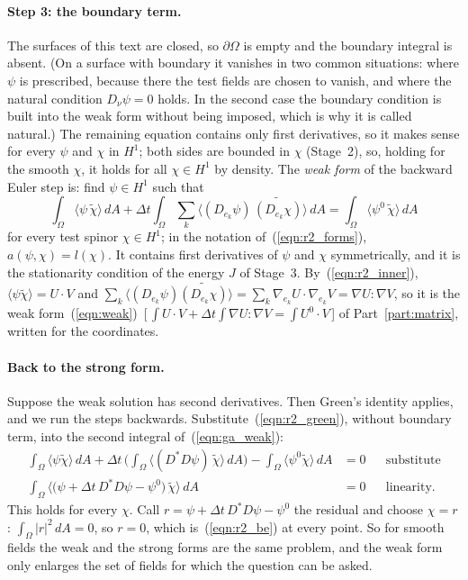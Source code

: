 \paragraph{Step 3: the boundary term.} The surfaces of this text are closed, so $\partial\Omega$ is empty and the boundary integral is absent. (On a surface with boundary it vanishes in two common situations: where $\psi$ is prescribed, because there the test fields are chosen to vanish, and where the natural condition $D_\nu\psi = 0$ holds. In the second case the boundary condition is built into the weak form without being imposed, which is why it is called natural.) The remaining equation contains only first derivatives, so it makes sense for every $\psi$ and $\chi$ in $H^1$; both sides are bounded in $\chi$ (Stage~2), so, holding for the smooth $\chi$, it holds for all $\chi\in H^1$ by density. The \emph{weak form} of the backward Euler step is: find $\psi \in H^1$ such that
\begin{equation}
\label{eqn:ga_weak}
\int_\Omega \langle \psi\, \widetilde\chi \rangle\, dA + \Delta t \int_\Omega \sum_k \langle (D_{e_k} \psi)\, \widetilde{(D_{e_k} \chi)} \rangle\, dA = \int_\Omega \langle \psi^0\, \widetilde\chi \rangle\, dA
\end{equation}
for every test spinor $\chi \in H^1$; in the notation of~(\ref{eqn:r2_forms}), $a(\psi, \chi) = l(\chi)$. It contains first derivatives of $\psi$ and $\chi$ symmetrically, and it is the stationarity condition of the energy $J$ of Stage~3. By~(\ref{eqn:r2_inner}), $\langle\psi\widetilde\chi\rangle = U\cdot V$ and $\sum_k\langle (D_{e_k}\psi)\widetilde{(D_{e_k}\chi)}\rangle = \sum_k \nabla_{e_k}U\cdot\nabla_{e_k}V = \nabla U : \nabla V$, so it is the weak form~(\ref{eqn:weak})~[\,$\int U\cdot V + \Delta t\int\nabla U:\nabla V = \int U^0\cdot V$\,] of Part~\ref{part:matrix}, written for the coordinates.

\paragraph{Back to the strong form.} Suppose the weak solution has second derivatives. Then Green's identity applies, and we run the steps backwards. Substitute~(\ref{eqn:r2_green}), without boundary term, into the second integral of~(\ref{eqn:ga_weak}):
\begin{align*}
\int_\Omega \langle\psi\widetilde\chi\rangle\, dA + \Delta t\,\Big(\int_\Omega \big\langle (D^*D\psi)\,\widetilde\chi\big\rangle\, dA\Big) - \int_\Omega \langle\psi^0\widetilde\chi\rangle\, dA &= 0 && \text{substitute} \\
\int_\Omega \big\langle \big(\psi + \Delta t\, D^*D\psi - \psi^0\big)\,\widetilde\chi\big\rangle\, dA &= 0 && \text{linearity.}
\end{align*}
This holds for every $\chi$. Call $r = \psi + \Delta t\, D^*D\psi - \psi^0$ the residual and choose $\chi = r$: $\int_\Omega|r|^2\, dA = 0$, so $r = 0$, which is~(\ref{eqn:r2_be}) at every point. So for smooth fields the weak and the strong forms are the same problem, and the weak form only enlarges the set of fields for which the question can be asked.


